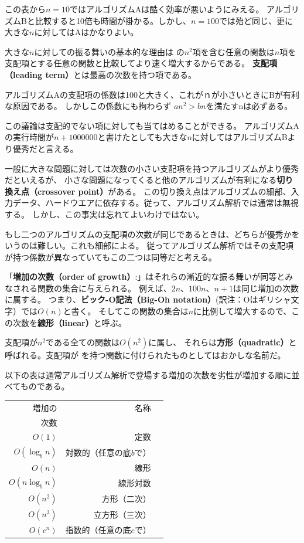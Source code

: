 \documentclass[a4j,12pt,makeidx]{jbook}
\begin{document}
この表から$n=10$ではアルゴリズムAは酷く効率が悪いようにみえる。
アルゴリズムBと比較すると10倍も時間が掛かる。しかし、$n=100$では殆ど同じ、更に大きな$n$に対してはAはかなりよい。\par
大きな$n$に対しての振る舞いの基本的な理由は の$n^2$項を含む任意の関数は$n$項を支配項とする任意の関数と比較してより速く増大するからである。
{\bf 支配項（leading term）}とは最高の次数を持つ項である。\par
アルゴリズムAの支配項の係数は100と大きく、これが$ｎ$が小さいときにBが有利な原因である。
しかしこの係数にも拘わらず $an^2>bn$を満たすnは必ずある。\par
この議論は支配的でない項に対しても当てはめることができる。
アルゴリズムAの実行時間が$n + 1000000$と書けたとしても大きな$n$に対してはアルゴリズムBより優秀だと言える。\par
一般に大きな問題に対しては次数の小さい支配項を持つアルゴリズムがより優秀だといえるが、
小さな問題になってくると他のアルゴリズムが有利になる{\bf 切り換え点（crossover point）}がある。
この切り換え点はアルゴリズムの細部、入力データ、ハードウエアに依存する。従って、アルゴリズム解析では通常は無視する。
しかし、この事実は忘れてよいわけではない。\par
もし二つのアルゴリズムの支配項の次数が同じであるときは、どちらが優秀かをいうのは難しい。これも細部による。
従ってアルゴリズム解析ではその支配項が持つ係数が異なっていてもこの二つは同等だと考える。\par
「{\bf 増加の次数（order of growth）}:」はそれらの漸近的な振る舞いが同等とみなされる関数の集合に与えられる。
例えば、$2n$、$100n$、$n+1$は同じ増加の次数に属する。
つまり、{\bf ビック-O記法（Big-Oh notation）}(訳注：Oはギリシャ文字）では$O(n)$と書く。
そしてこの関数の集合は$n$に比例して増大するので、この次数を{\bf 線形（linear）}と呼ぶ。\par
支配項が$n^2$である全ての関数は$Ο(n^2 )$に属し、
それらは{\bf 方形（quadratic）}と呼ばれる。支配項が を持つ関数に付けられたものとしてはおかしな名前だ。\par
以下の表は通常アルゴリズム解析で登場する増加の次数を劣性が増加する順に並べてものである。\\

\begin{tabular}{|r|r|r|}
\hline
増加の &   名称   \\
次数    &             \\
\hline
$O(1)$             & 定数　\\
$O(\log_b n)$      & 対数的（任意の底$b$で） \\
$O(n)$             & 線形　\\
$O(n \log_b n)$    &  線形対数 \\
$O(n^2)$           & 方形（二次） \\
$O(n^3)$           & 立方形（三次） \\
$O(c^n)$           & 指数的（任意の底$c$で） \\
\hline
\end{tabular}　\\\
\end{document}
